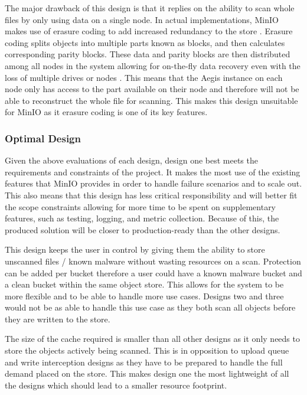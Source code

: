 \documentclass[12pt, conference, final, a4paper, onecolumn, compsoc]{IEEEtran}
\begin{document}
    The major drawback of this design is that it replies on the ability to scan
    whole files by only using data on a single node. In actual implementations,
    MinIO makes use of erasure coding to add increased redundancy to the store
    \citep{minio-erasure}. Erasure coding splits objects into multiple parts
    known as blocks, and then calculates corresponding parity blocks. These data
    and parity blocks are then distributed among all nodes in the system
    allowing for on-the-fly data recovery even with the loss of multiple drives
    or nodes . This means that the Aegis instance on each node only has access
    to the part available on their node and therefore will not be able to
    reconstruct the whole file for scanning. This makes this design unsuitable
    for MinIO as it erasure coding is one of its key features.


    \subsubsection*{Optimal Design}


    Given the above evaluations of each design, design one best meets the
    requirements and constraints of the project. It makes the most use of the
    existing features that MinIO provides in order to handle failure scenarios
    and to scale out. This also means that this design has less critical
    responsibility and will better fit the scope constraints allowing for more
    time to be spent on supplementary features, such as testing, logging, and
    metric collection. Because of this, the produced solution will be closer to
    production-ready than the other designs.

    This design keeps the user in control by giving them the ability to store
    unscanned files / known malware without wasting resources on a scan.
    Protection can be added per bucket therefore a user could have a known
    malware bucket and a clean bucket within the same object store. This allows
    for the system to be more flexible and to be able to handle more use cases.
    Designs two and three would not be as able to handle this use case as they
    both scan all objects before they are written to the store.

    The size of the cache required is smaller than all other designs as it only
    needs to store the objects actively being scanned. This is in opposition to
    upload queue and write interception designs as they have to be prepared to
    handle the full demand placed on the store. This makes design one the most
    lightweight of all the designs which should lead to a smaller resource
    footprint.
\end{document}

